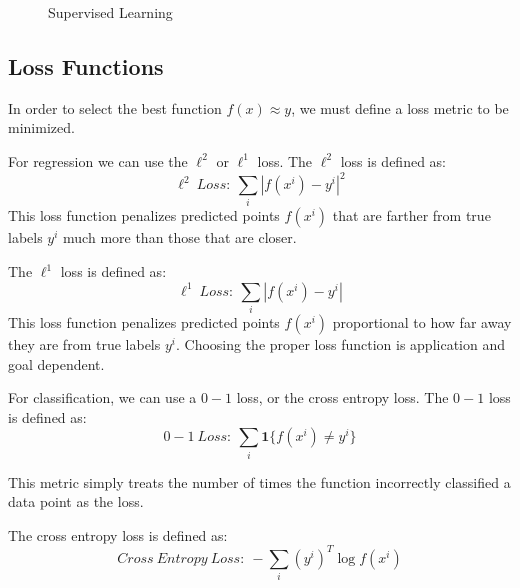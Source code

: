 \documentclass[twoside]{article}
\begin{document}
\begin{figure}[!ht]%
    \centering
    \qquad
    \caption{Supervised Learning}%
    \label{fig:supervised_learning}%
\end{figure}

\subsection{Loss Functions}

In order to select the best function $f(x) \approx y$, we must define a loss metric to be minimized.

For regression we can use the $\ell^2$ or $\ell^1$ loss. The $\ell^2$ loss is defined as:
$$\ell^2 \ Loss: \ \sum_{i} |f(x^i) - y^i|^2$$
This loss function penalizes predicted points $f(x^i)$ that are farther from true labels $y^i$ much more than those that are closer.

The $\ell^1$ loss is defined as:
$$ \ell^1 \ Loss: \ \sum_{i} |f(x^i) - y^i|$$
This loss function penalizes predicted points $f(x^i)$ proportional to how far away they are from true labels $y^i$. Choosing the proper loss function is application and goal dependent.

For classification, we can use a $0-1$ loss, or the cross entropy loss. The $0-1$ loss is defined as:
$$0-1 \ Loss: \ \sum_{i} \textbf{1} \{f(x^i) \neq y^i \}$$

This metric simply treats the number of times the function incorrectly classified a data point as the loss.

The cross entropy loss is defined as:
$$Cross\ Entropy\ Loss: \ -\sum_{i} (y^i)^T \log{f(x^i)}$$
\end{document}
